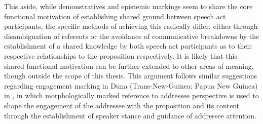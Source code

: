 This aside, while demonstratives and epistemic markings seem to share the core functional motivation of establishing shared ground between speech act participants, the specific methods of achieving this radically differ, either through disambiguation of referents or the avoidance of communicative breakdowns by the establishment of a shared knowledge by both speech act participants as to their respective relationships to the proposition respectively. It is likely that this shared functional motivation can be further extended to other areas of meaning, though outside the scope of this thesis. This argument follows similar suggestions regarding engagement marking in Duna (Trans-New-Guinea: Papua New Guinea) in , in which morphologically marked reference to addressee perspective is used to shape the engagement of the addressee with the proposition and its content through the establishment of speaker stance and guidance of addressee attention.


